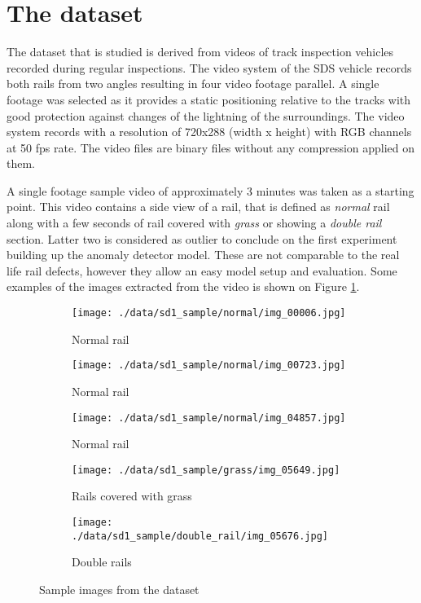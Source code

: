 \section{The dataset} \label{dataset}
The dataset that is studied is derived from videos of track inspection vehicles recorded during regular
inspections.
The video system of the SDS vehicle records both rails from two angles resulting in four video footage
parallel.
A single footage was selected as it provides a static positioning relative to the tracks with good
protection against changes of the lightning of the surroundings.
The video system records with a resolution of 720x288 (width x height) with RGB channels
at 50 fps rate.
The video files are binary files without any compression applied on them.

A single footage sample video of approximately 3 minutes was taken as a starting point.
This video contains a side view of a rail, that is defined as \emph{normal} rail
along with a few seconds of rail covered with \emph{grass} or showing a \emph{double rail} section.
Latter two is considered as outlier to conclude on the first experiment building up the anomaly
detector model.
These are not comparable to the real life rail defects, however they allow an easy model setup and
evaluation.
Some examples of the images extracted from the video is shown on Figure \ref{fig:example_images}.

\begin{figure}[H]
    \centering
    \begin{subfigure}{0.3\textwidth}
        \centering
        \texttt{[image: ./data/sd1\_sample/normal/img\_00006.jpg]}
        \caption*{Normal rail}
    \end{subfigure}
    \begin{subfigure}{0.3\textwidth}
        \centering
        \texttt{[image: ./data/sd1\_sample/normal/img\_00723.jpg]}
        \caption*{Normal rail}
    \end{subfigure}
    \begin{subfigure}{0.3\textwidth}
        \centering
        \texttt{[image: ./data/sd1\_sample/normal/img\_04857.jpg]}
        \caption*{Normal rail}
    \end{subfigure}
    \begin{subfigure}{0.3\textwidth}
        \centering
        \texttt{[image: ./data/sd1\_sample/grass/img\_05649.jpg]}
        \caption*{Rails covered with grass}
    \end{subfigure}
    \begin{subfigure}{0.3\textwidth}
        \centering
        \texttt{[image: ./data/sd1\_sample/double\_rail/img\_05676.jpg]}
        \caption*{Double rails}
    \end{subfigure}
    \caption{Sample images from the dataset}
    \label{fig:example_images}
\end{figure}

